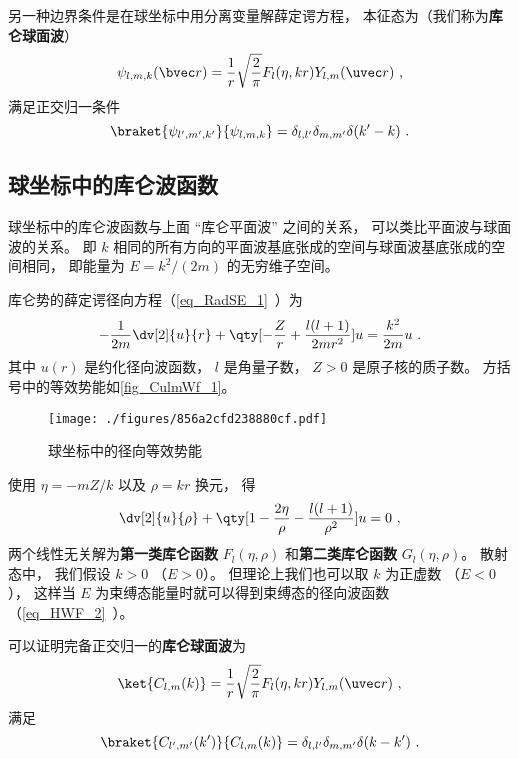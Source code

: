 另一种边界条件是在球坐标中用分离变量解薛定谔方程， 本征态为（我们称为\textbf{库仑球面波}）
\begin{equation}\label{eq_CulmWf_11}
\psi_{l,m,k}(\bvec r) = \frac{1}{r} \sqrt{\frac{2}{\pi}} F_l(\eta, kr) Y_{l,m}(\uvec r)~,
\end{equation}
满足正交归一条件
\begin{equation}
\braket{\psi_{l',m',k'}}{\psi_{l,m,k}} = \delta_{l,l'}\delta_{m,m'} \delta(k'-k)~.
\end{equation}

\subsection{球坐标中的库仑波函数}
球坐标中的库仑波函数与上面 “库仑平面波” 之间的关系， 可以类比平面波与球面波的关系。 即 $k$ 相同的所有方向的平面波基底张成的空间与球面波基底张成的空间相同， 即能量为 $E = k^2/(2m)$ 的无穷维子空间。

库仑势的薛定谔径向方程（\autoref{eq_RadSE_1}~）为
\begin{equation}\label{eq_CulmWf_5}
-\frac{1}{2m} \dv[2]{u}{r} + \qty[-\frac{Z}{r} + \frac{l(l+1)}{2mr^2}]u = \frac{k^2}{2m}u~.
\end{equation}
其中 $u(r)$ 是约化径向波函数， $l$ 是角量子数， $Z > 0$ 是原子核的质子数。 方括号中的等效势能如\autoref{fig_CulmWf_1}。
\begin{figure}[ht]
\centering
\texttt{[image: ./figures/856a2cfd238880cf.pdf]}
\caption{球坐标中的径向等效势能} \label{fig_CulmWf_1}
\end{figure}
使用 $\eta = -mZ/k$ 以及 $\rho = kr$ 换元， 得
\begin{equation}
\dv[2]{u}{\rho} + \qty[1 - \frac{2\eta}{\rho} - \frac{l(l+1)}{\rho^2}]u = 0~,
\end{equation}
两个线性无关解为\textbf{第一类库仑函数} $F_l(\eta, \rho)$ 和\textbf{第二类库仑函数} $G_l(\eta, \rho)$。 散射态中， 我们假设 $k > 0$ （$E > 0$）。 但理论上我们也可以取 $k$ 为正虚数 （$E < 0$）， 这样当 $E$ 为束缚态能量时就可以得到束缚态的径向波函数（\autoref{eq_HWF_2}~）。

可以证明完备正交归一的\textbf{库仑球面波}为
\begin{equation}\label{eq_CulmWf_1}
\ket{C_{l,m}(k)} = \frac{1}{r} \sqrt{\frac{2}{\pi}} F_l(\eta, kr) Y_{l,m}(\uvec r)~,
\end{equation}
满足
\begin{equation}\label{eq_CulmWf_2}
\braket{C_{l',m'}(k')}{C_{l,m}(k)} = \delta_{l,l'}\delta_{m,m'}\delta(k-k')~.
\end{equation}

